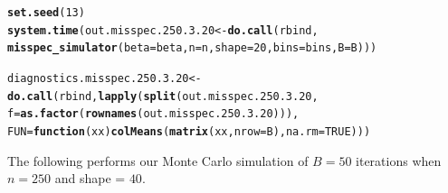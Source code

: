 \documentclass[11pt]{article}\usepackage[]{graphicx}\usepackage[]{color}
\makeatletter
\newcommand{\hlnum}[1]{\textcolor[rgb]{0.686,0.059,0.569}{#1}}%
\newcommand{\hlstd}[1]{\textcolor[rgb]{0.345,0.345,0.345}{#1}}%
\newcommand{\hlkwa}[1]{\textcolor[rgb]{0.161,0.373,0.58}{\textbf{#1}}}%
\newcommand{\hlkwb}[1]{\textcolor[rgb]{0.69,0.353,0.396}{#1}}%
\newcommand{\hlkwc}[1]{\textcolor[rgb]{0.333,0.667,0.333}{#1}}%
\newcommand{\hlkwd}[1]{\textcolor[rgb]{0.737,0.353,0.396}{\textbf{#1}}}%
\newenvironment{kframe}{%
 \def\at@end@of@kframe{}%
 \ifinner\ifhmode%
  \def\at@end@of@kframe{\end{minipage}}%
  \begin{minipage}{\columnwidth}%
 \fi\fi%
 \def\FrameCommand##1{\hskip\@totalleftmargin \hskip-\fboxsep
 \colorbox{shadecolor}{##1}\hskip-\fboxsep
     \hskip-\linewidth \hskip-\@totalleftmargin \hskip\columnwidth}%
 \MakeFramed {\advance\hsize-\width
   \@totalleftmargin\z@ \linewidth\hsize
   \@setminipage}}%
 {\par\unskip\endMakeFramed%
 \at@end@of@kframe}
\newenvironment{knitrout}{}{} %
\makeatother
\begin{document}
\begin{knitrout}
\color{fgcolor}\begin{kframe}
\begin{alltt}
\hlkwd{set.seed}\hlstd{(}\hlnum{13}\hlstd{)}
\hlkwd{system.time}\hlstd{(out.misspec.250.3.20} \hlkwb{<-} \hlkwd{do.call}\hlstd{(rbind,}
  \hlkwd{misspec_simulator}\hlstd{(}\hlkwc{beta} \hlstd{= beta,} \hlkwc{n} \hlstd{= n,} \hlkwc{shape} \hlstd{=} \hlnum{20}\hlstd{,} \hlkwc{bins} \hlstd{= bins,} \hlkwc{B} \hlstd{= B)))}
\end{alltt}


{\ttfamily\noindent\bfseries\color{errorcolor}{\#\# Error in chol.default(crossprod(x) + lambda[j] * diag(v)): the leading minor of order 5 is not positive definite}}

{\ttfamily\noindent\itshape\color{messagecolor}{\#\# Timing stopped at: 0.178 0 0.179}}\begin{alltt}
\hlstd{diagnostics.misspec.250.3.20} \hlkwb{<-} \hlkwd{do.call}\hlstd{(rbind,} \hlkwd{lapply}\hlstd{(}\hlkwd{split}\hlstd{(out.misspec.250.3.20,}
  \hlkwc{f} \hlstd{=} \hlkwd{as.factor}\hlstd{(}\hlkwd{rownames}\hlstd{(out.misspec.250.3.20))),}
  \hlkwc{FUN} \hlstd{=} \hlkwa{function}\hlstd{(}\hlkwc{xx}\hlstd{)} \hlkwd{colMeans}\hlstd{(}\hlkwd{matrix}\hlstd{(xx,} \hlkwc{nrow} \hlstd{= B),} \hlkwc{na.rm} \hlstd{=} \hlnum{TRUE}\hlstd{)))}
\end{alltt}


{\ttfamily\noindent\bfseries\color{errorcolor}{\#\# Error in split(out.misspec.250.3.20, f = as.factor(rownames(out.misspec.250.3.20))): object 'out.misspec.250.3.20' not found}}\end{kframe}
\end{knitrout}


The following performs our Monte Carlo simulation of $B = 50$ iterations 
when $n = 250$ and shape = $40$.
\end{document}
